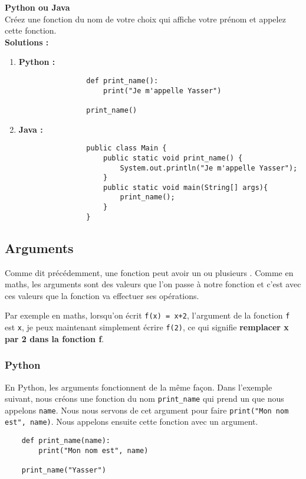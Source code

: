 \begin{Exercice}[2 minutes] \textbf{Python ou Java} \\
    Créez une fonction du nom de votre choix qui affiche votre prénom et appelez cette fonction.
    \\
    \textbf{Solutions :}
    \begin{enumerate}
        \item \textbf{Python :}
            \begin{verbatim}
                def print_name():
                    print("Je m'appelle Yasser")
                    
                print_name()
            \end{verbatim}
        \item \textbf{Java :}
            \begin{verbatim}
                public class Main {
                    public static void print_name() {
                        System.out.println("Je m'appelle Yasser"); 
                    }
                    public static void main(String[] args){
                        print_name();
                    }
                }
            \end{verbatim}
    \end{enumerate}
        
\end{Exercice}

\subsection{Arguments}

Comme dit précédemment, une fonction peut avoir un ou plusieurs . Comme en maths, les arguments sont des valeurs que l'on passe à notre fonction et c'est avec ces valeurs que la fonction va effectuer ses opérations.

Par exemple en maths, lorsqu'on écrit \lstinline{f(x) = x+2}, l'argument de la fonction \lstinline{f} est \lstinline{x}, je peux maintenant simplement écrire \lstinline{f(2)}, ce qui signifie \textbf{remplacer x par 2 dans la fonction f}.

\subsubsection{Python}

En Python, les arguments fonctionnent de la même façon. Dans l'exemple suivant, nous créons une fonction du nom \lstinline{print_name} qui prend un  que nous appelons \lstinline{name}. Nous nous servons de cet argument pour faire \lstinline{print("Mon nom est", name)}. Nous appelons ensuite cette fonction avec un argument.  
\begin{verbatim}
    def print_name(name):
        print("Mon nom est", name)
        
    print_name("Yasser")
\end{verbatim}

